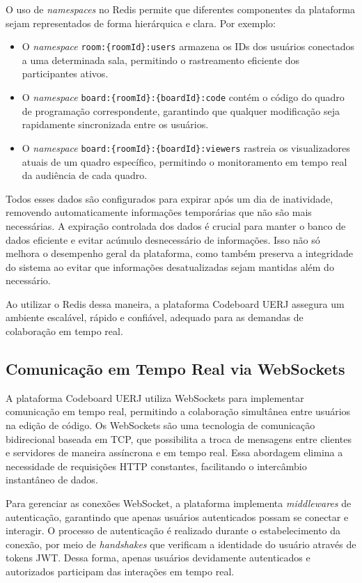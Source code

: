 O uso de \emph{namespaces} no Redis permite que diferentes componentes da plataforma sejam representados de forma hierárquica e clara. Por exemplo:
\begin{itemize}
    \item O \emph{namespace} \texttt{room:\{roomId\}:users} armazena os IDs dos usuários conectados a uma determinada sala, permitindo o rastreamento eficiente dos participantes ativos.
    \item O \emph{namespace} \texttt{board:\{roomId\}:\{boardId\}:code} contém o código do quadro de programação correspondente, garantindo que qualquer modificação seja rapidamente sincronizada entre os usuários.
    \item O \emph{namespace} \texttt{board:\{roomId\}:\{boardId\}:viewers} rastreia os visualizadores atuais de um quadro específico, permitindo o monitoramento em tempo real da audiência de cada quadro.
\end{itemize}

Todos esses dados são configurados para expirar após um dia de inatividade, removendo automaticamente informações temporárias que não são mais necessárias. A expiração controlada dos dados é crucial para manter o banco de dados eficiente e evitar acúmulo desnecessário de informações. Isso não só melhora o desempenho geral da plataforma, como também preserva a integridade do sistema ao evitar que informações desatualizadas sejam mantidas além do necessário.

Ao utilizar o Redis dessa maneira, a plataforma Codeboard UERJ assegura um ambiente escalável, rápido e confiável, adequado para as demandas de colaboração em tempo real.


\subsection{Comunicação em Tempo Real via WebSockets}

A plataforma Codeboard UERJ utiliza WebSockets para implementar comunicação em tempo real, permitindo a colaboração simultânea entre usuários na edição de código. Os WebSockets são uma tecnologia de comunicação bidirecional baseada em TCP, que possibilita a troca de mensagens entre clientes e servidores de maneira assíncrona e em tempo real. Essa abordagem elimina a necessidade de requisições HTTP constantes, facilitando o intercâmbio instantâneo de dados.

Para gerenciar as conexões WebSocket, a plataforma implementa \emph{middlewares} de autenticação, garantindo que apenas usuários autenticados possam se conectar e interagir. O processo de autenticação é realizado durante o estabelecimento da conexão, por meio de \emph{handshakes} que verificam a identidade do usuário através de tokens JWT. Dessa forma, apenas usuários devidamente autenticados e autorizados participam das interações em tempo real.

